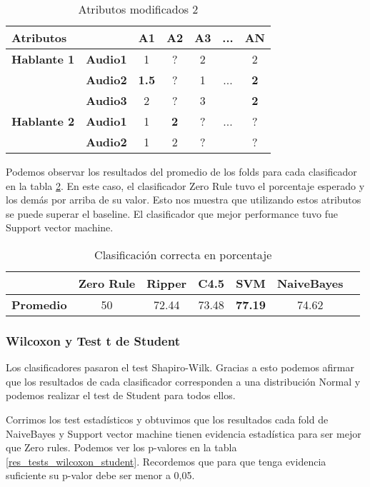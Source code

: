 \begin{table}[H]
	\centering
	\begin{tabular}{|l|l|ccccc|}
		\hline
		\multicolumn{2}{|l|}{Atributos} & A1 & A2 & A3 & ... & AN \\
		\hline 
		\textbf{Hablante 1} & \textbf{Audio1} & 1 & ? & 2 & & 2\\
		& \textbf{Audio2} & \textbf{1.5} & ? & 1 & ... & \textbf{2} \\
		& \textbf{Audio3} & 2 & ? & 3 & & \textbf{2} \\
		\hline
		\textbf{Hablante 2} & \textbf{Audio1} & 1 & \textbf{2} & ? & ... & ? \\
		& \textbf{Audio2} & 1 & 2 & ? & & ? \\
		\hline
	\end{tabular}
	\caption{Atributos modificados 2}
	\label{attr_mod}
\end{table}

Podemos observar los resultados del promedio de los folds para cada clasificador en la tabla \ref{class_corr_en_pct}. En este caso, el clasificador Zero Rule tuvo el porcentaje esperado y los demás por arriba de su valor. Esto nos muestra que utilizando estos atributos se puede superar el baseline. El clasificador que mejor performance tuvo fue Support vector machine.

\begin{table}[H]
	\centering
	\begin{tabular}{|l|c|c|c|c|c|c|}
		\hline
		\textbf{}  & \textbf{Zero Rule} & \textbf{Ripper} & \textbf{C4.5} & \textbf{SVM} & \textbf{NaiveBayes} \\ \hline
		\textbf{Promedio} & 50 & 72.44 & 73.48 & \textbf{77.19} & 74.62 \\ \hline
	\end{tabular}
	\caption{Clasificación correcta en porcentaje}
	\label{class_corr_en_pct}
\end{table}

\subsubsection{Wilcoxon y Test t de Student}

Los clasificadores pasaron el test Shapiro-Wilk. Gracias a esto podemos afirmar que los resultados de cada clasificador corresponden a una distribución Normal y podemos realizar el test de Student para todos ellos.

Corrimos los test estadísticos y obtuvimos que los resultados cada fold de NaiveBayes y Support vector machine tienen evidencia estadística para ser mejor que Zero rules. Podemos ver los p-valores en la tabla \ref{res_tests_wilcoxon_student}. Recordemos que para que tenga evidencia suficiente su p-valor debe ser menor a 0,05.

